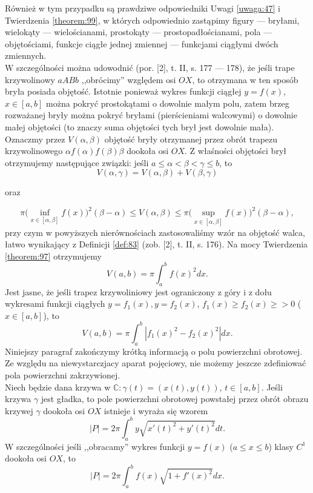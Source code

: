 \documentclass[leqno]{article}
\begin{document}
\begin{justify}
Również w tym przypadku są prawdziwe odpowiedniki Uwagi \ref{uwaga:47} i Twierdzenia \ref{theorem:99}, w których odpowiednio
zastąpimy figury --- bryłami, wielokąty --- wielościanami, prostokąty --- prostopadłościanami, pola --- objętościami, funkcje ciągłe jednej zmiennej
--- funkcjami ciągłymi dwóch zmiennych. \\
W szczególności można udowodnić (por. [2], t. II, s. 177 --- 178), że jeśli trape
krzywolinowy $aABb$ ,,obrócimy'' względem osi $OX$, to otrzymana w ten sposób bryła posiada objętość.
Istotnie ponieważ wykres funkcji ciągłej $y = f(x)$, $x \in [a,b]$ można pokryć prostokątami o dowolnie małym polu,
zatem brzeg rozważanej bryły można pokryć bryłami (pierścieniami walcowymi) o dowolnie małej objętości (to znaczy suma objętości tych brył jest dowolnie mała). \\
Oznaczmy przez $V(\alpha, \beta)$ objętość bryły otrzymanej przez obrót trapezu krzywolinowego $\alpha f(\alpha) f(\beta) \beta$ dookoła osi $OX$. Z właśności objętości brył
otrzymujemy następujące związki: jeśli $a \leqslant \alpha < \beta < \gamma \leqslant b$, to
\[
    V(\alpha, \gamma) = V(\alpha, \beta) + V(\beta, \gamma)
\]
\begin{center}
    oraz
\end{center}
\[
    \pi\Bigg( \inf\limits_{x \in [\alpha, \beta]}f(x)\Bigg)^2(\beta - \alpha)
    \leqslant V(\alpha, \beta) \leqslant 
    \pi\Bigg( \sup\limits_{x \in [\alpha, \beta]}f(x)\Bigg)^2(\beta - \alpha),
\]
przy czym w powyższych nierównościach zastosowaliśmy wzór na objętość walca,
łatwo wynikający z Definicji \ref{def:83} (zob. [2], t. II, s. 176). Na mocy Twierdzenia \ref{theorem:97} otrzymujemy
\[
    V(a, b) = \pi \int_{a}^{b}f(x)^2dx.
\]
Jest jasne, że jeśli trapez krzywoliniowy jest ograniczony z góry i z dołu wykresami funkcji ciągłych
$y = f_1(x), y = f_2(x)$, $f_1(x) \geqslant f_2(x) \geqslant > 0$ ($x \in [a,b]$), to
\[
    V(a, b) = \pi \int_{a}^{b}|f_1(x)^2 - f_2(x)^2|dx.
\]
Niniejszy paragraf zakończymy krótką informacją o polu powierzchni obrotowej. Ze względu na niewystarczjacy aparat pojęciowy, nie możemy jeszcze
zdefiniować pola powierzchni zakrzywionej. \\
Niech będzie dana krzywa w $\mathbb{C} : \gamma(t) = (x(t), y(t))$, $t \in [a,b]$. Jeśli krzywa $\gamma$ jest gładka,
to pole powierzchni obrotowej powstałej przez obrót obrazu krzywej $\gamma$ dookoła osi $OX$ istnieje i wyraża się wzorem
\[
    |P| = 2\pi \int_{a}^{b} y \sqrt{x'(t)^2 + y'(t)^2}dt.
\]
W szczególności jeśli ,,obracamy'' wykres funkcji $y = f(x)$ ($a \leqslant x \leqslant b$) klasy $C^1$ dookoła osi $OX$, to
\[
    |P| = 2\pi \int_{a}^{b}f(x)\sqrt{1 + f'(x)^2}dx.
\]


\end{justify}
\end{document}
